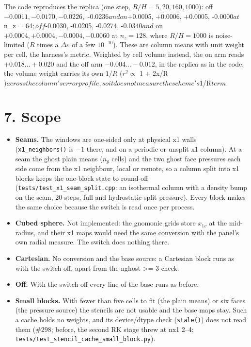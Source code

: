 \documentclass[11pt,a4paper]{article}
\begin{document}
The code reproduces the replica (one step, $R/H = 5, 20, 160, 1000$): off $-0.0011, -0.0170, -0.0226,$
-0.0236$ and on $+0.0005, +0.0006, +0.0005, -0.0000$ at $n\_z = 64$; off $-0.0030, -0.0205, -0.0274, -0.0340$ and$
on $+0.0004, +0.0004, -0.0004, -0.0060$ at $n_z = 128$, where $R/H = 1000$ is noise-limited ($R$ times a
$\Delta\varepsilon$ of a few $10^{-10}$). These are column means with unit weight per cell, the harness's
metric. Weighted by cell volume instead, the on arm reads $+0.018 \ldots +0.020$ and the off arm
$-0.004 \ldots -0.012$, in the replica as in the code: the volume weight carries its own $1/R$ ($r^2 \propto$
1 + 2x/R$) across the column's error profile, so it does not measure the scheme's $1/R$ term.$

\section*{7. Scope}

\begin{itemize}
\item \textbf{Seams.} The windows are one-sided only at physical x1 walls (\texttt{x1\_neighbors()} is $-1$ there, and on a
  periodic or unsplit x1 column). At a seam the ghost plain means ($n_g$ cells) and the two ghost face
  pressures each side come from the x1 neighbour, local or remote, so a column split into x1 blocks keeps the
  one-block state to round-off (\texttt{tests/test\_x1\_seam\_split.cpp}: an isothermal column with a density bump on
  the seam, 20 steps, full and hydrostatic-split pressure). Every block makes the same choice because the
  switch is read once per process.
\item \textbf{Cubed sphere.} Not implemented: the gnomonic grids store $x_{1v}$ at the mid-radius, and their x1 maps
  would need the same conversion with the panel's own radial measure. The switch does nothing there.
\item \textbf{Cartesian.} No conversion and the base source: a Cartesian block runs as with the switch off, apart from
  the nghost >= 3 check.
\item \textbf{Off.} With the switch off every line of the base runs as before.
\item \textbf{Small blocks.} With fewer than five cells to fit (the plain means) or six faces (the pressure source) the
  stencils are not usable and the base maps stay. Such a cache holds no weights, and its device/dtype check
  (\texttt{stale()}) does not read them (\#298; before, the second RK stage threw at nx1 2–4;
  \texttt{tests/test\_stencil\_cache\_small\_block.py}).
\end{itemize}
\end{document}
